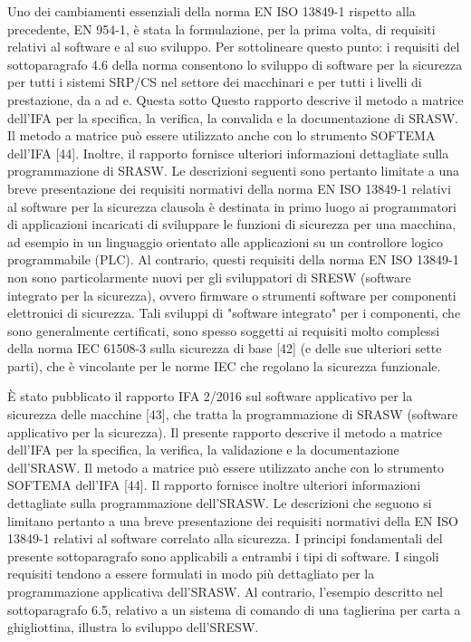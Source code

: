Uno dei cambiamenti essenziali della norma EN ISO 13849-1 rispetto alla precedente, EN 954-1, è stata la formulazione, per la prima volta, di requisiti relativi al software e al suo sviluppo. Per sottolineare questo punto: i requisiti del sottoparagrafo 4.6 della norma consentono lo sviluppo di software per la sicurezza per tutti i sistemi SRP/CS nel settore dei macchinari e per tutti i livelli di prestazione, da a ad e. Questa sotto Questo rapporto descrive il metodo a matrice dell'IFA per la specifica, la verifica, la convalida e la documentazione di SRASW. Il metodo a matrice può essere utilizzato anche con lo strumento SOFTEMA dell'IFA [44]. Inoltre, il rapporto fornisce ulteriori informazioni dettagliate sulla programmazione di SRASW. Le descrizioni seguenti sono pertanto limitate a una breve presentazione dei requisiti normativi della norma EN ISO 13849-1 relativi al software per la sicurezza clausola è destinata in primo luogo ai programmatori di applicazioni incaricati di sviluppare le funzioni di sicurezza per una macchina, ad esempio in un linguaggio orientato alle applicazioni su un controllore logico programmabile (PLC). Al contrario, questi requisiti della norma EN ISO 13849-1 non sono particolarmente nuovi per gli sviluppatori di SRESW (software integrato per la sicurezza), ovvero firmware o strumenti software per componenti elettronici di sicurezza. Tali sviluppi di "software integrato" per i componenti, che sono generalmente certificati, sono spesso soggetti ai requisiti molto complessi della norma IEC 61508-3 sulla sicurezza di base [42] (e delle sue ulteriori sette parti), che è vincolante per le norme IEC che regolano la sicurezza funzionale.

È stato pubblicato il rapporto IFA 2/2016 sul software applicativo per la sicurezza delle macchine [43], che tratta la programmazione di SRASW (software applicativo per la sicurezza). Il presente rapporto descrive il metodo a matrice dell'IFA per la specifica, la verifica, la validazione e la documentazione dell'SRASW. Il metodo a matrice può essere utilizzato anche con lo strumento SOFTEMA dell'IFA [44]. Il rapporto fornisce inoltre ulteriori informazioni dettagliate sulla programmazione dell'SRASW. Le descrizioni che seguono si limitano pertanto a una breve presentazione dei requisiti normativi della EN ISO 13849-1 relativi al software correlato alla sicurezza.
I principi fondamentali del presente sottoparagrafo sono applicabili a entrambi i tipi di software. I singoli requisiti tendono a essere formulati in modo più dettagliato per la programmazione applicativa dell'SRASW. Al contrario, l'esempio descritto nel sottoparagrafo 6.5, relativo a un sistema di comando di una taglierina per carta a ghigliottina, illustra lo sviluppo dell'SRESW.

